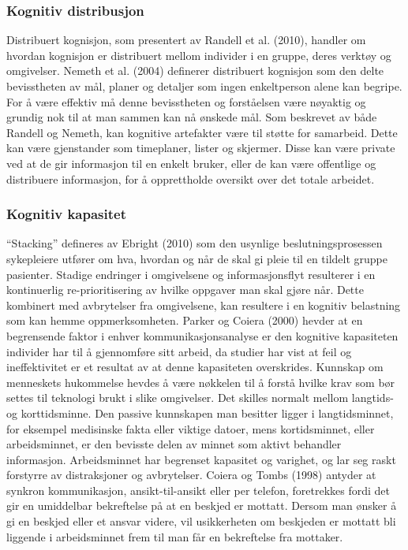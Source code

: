 \subsubsection{Kognitiv distribusjon}
Distribuert kognisjon, som presentert av Randell et al. (2010), handler om hvordan kognisjon er distribuert mellom individer i en gruppe, deres verktøy og omgivelser. Nemeth et al. (2004) definerer distribuert kognisjon som den delte bevisstheten av mål, planer og detaljer som ingen enkeltperson alene kan begripe. For å være effektiv må denne bevisstheten og forståelsen være nøyaktig og grundig nok til at man sammen kan nå ønskede mål. Som beskrevet av både Randell og Nemeth, kan kognitive artefakter være til støtte for samarbeid. Dette kan være gjenstander som timeplaner, lister og skjermer. Disse kan være private ved at de gir informasjon til en enkelt bruker, eller de kan være offentlige og distribuere informasjon, for å opprettholde oversikt over det totale arbeidet.

\subsubsection{Kognitiv kapasitet}
“Stacking” defineres av Ebright (2010) som den usynlige beslutningsprosessen sykepleiere utfører om hva, hvordan og når de skal gi pleie til en tildelt gruppe pasienter. Stadige endringer i omgivelsene og informasjonsflyt resulterer i en kontinuerlig re-prioritisering av hvilke oppgaver man skal gjøre når. Dette kombinert med avbrytelser fra omgivelsene, kan resultere i en kognitiv belastning som kan hemme oppmerksomheten. Parker og Coiera (2000) hevder at en begrensende faktor i enhver kommunikasjonsanalyse er den kognitive kapasiteten individer har til å gjennomføre sitt arbeid, da studier har vist at feil og ineffektivitet er et resultat av at denne kapasiteten overskrides. Kunnskap om menneskets hukommelse hevdes å være nøkkelen til å forstå hvilke krav som bør settes til teknologi brukt i slike omgivelser. Det skilles normalt mellom langtids- og korttidsminne. Den passive kunnskapen man besitter ligger i langtidsminnet, for eksempel medisinske fakta eller viktige datoer, mens kortidsminnet, eller arbeidsminnet, er den bevisste delen av minnet som aktivt behandler informasjon. Arbeidsminnet har begrenset kapasitet og varighet, og lar seg raskt forstyrre av distraksjoner og avbrytelser. Coiera og Tombs (1998) antyder at synkron kommunikasjon, ansikt-til-ansikt eller per telefon, foretrekkes fordi det gir en umiddelbar bekreftelse på at en beskjed er mottatt. Dersom man ønsker å gi en beskjed eller et ansvar videre, vil usikkerheten om beskjeden er mottatt bli liggende i arbeidsminnet frem til man får en bekreftelse fra mottaker. 


